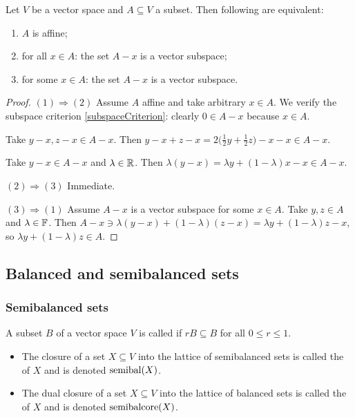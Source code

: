 \begin{proposition}
Let $V$ be a vector space and $A\subseteq V$ a subset. Then following are equivalent:
\begin{enumerate}
\item $A$ is affine;
\item for all $x\in A$: the set $A-x$ is a vector subspace;
\item for some $x\in A$: the set $A-x$ is a vector subspace.
\end{enumerate}
\end{proposition}
\begin{proof}
$(1) \Rightarrow (2)$ Assume $A$ affine and take arbitrary $x\in A$. We verify the subspace criterion \ref{subspaceCriterion}: clearly $0\in A-x$ because $x\in A$.

Take $y-x, z-x \in A-x$. Then $y-x + z-x = 2\Big(\frac{1}{2}y + \frac{1}{2}z\Big) - x -x \in A-x$.

Take $y-x\in A-x$ and $\lambda\in \mathbb{R}$. Then $\lambda(y-x) = \lambda y + (1-\lambda)x - x \in A-x$.

$(2) \Rightarrow (3)$ Immediate.

$(3) \Rightarrow (1)$ Assume $A-x$ is a vector subspace for some $x\in A$. Take $y,z\in A$ and $\lambda\in \mathbb{F}$. Then $A-x \ni \lambda(y-x)+(1-\lambda)(z-x) = \lambda y + (1-\lambda)z - x$, so $\lambda y + (1-\lambda)z \in A$. 
\end{proof}


\subsection{Balanced and semibalanced sets}
\subsubsection{Semibalanced sets}
\begin{definition}
A subset $B$ of a vector space $V$ is called  if $rB \subseteq B$ for all $0\leq r \leq 1$.

\begin{itemize}
\item The closure of a set $X\subseteq V$ into the lattice of semibalanced sets is called the  of $X$ and is denoted $\operatorname{semibal}(X)$.
\item The dual closure of a set $X\subseteq V$ into the lattice of balanced sets is called the  of $X$ and is denoted $\operatorname{semibalcore}(X)$.
\end{itemize}
\end{definition}

